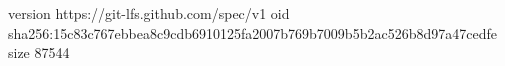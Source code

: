 version https://git-lfs.github.com/spec/v1
oid sha256:15c83c767ebbea8c9cdb6910125fa2007b769b7009b5b2ac526b8d97a47cedfe
size 87544
